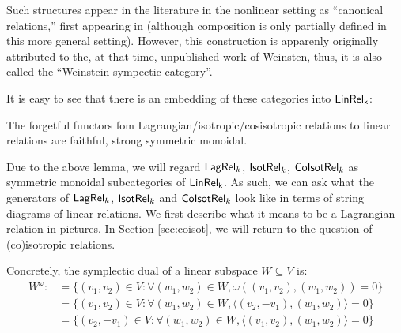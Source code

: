 Such structures appear in the literature in the nonlinear setting as ``canonical relations,'' first appearing in \cite{Guillemin} (although composition is only partially defined in this more general setting).  However, this construction is  apparenly originally attributed to the, at that time, unpublished work of Weinsten, thus, it is also called the ``Weinstein sympectic category''.




It is easy to see that there is an embedding of these categories into $\sf LinRel_k$:

\begin{lemma}
\label{lemma:strong}
The forgetful functors fom Lagrangian/isotropic/cosisotropic relations to linear relations  are faithful, strong symmetric monoidal.
\end{lemma}



Due to the above lemma, we will regard $\mathsf{Lag}\mathsf{Rel}_k$, ${\sf Isot}\mathsf{Rel}_k$, ${\sf Co}{\sf Isot}\mathsf{Rel}_k$ as symmetric monoidal subcategories of $\sf LinRel_k$.
As such, we can ask what the generators of $\mathsf{Lag}\mathsf{Rel}_k$, ${\sf Isot}\mathsf{Rel}_k$ and ${\sf Co}{\sf Isot}\mathsf{Rel}_k$ look like in terms of string diagrams of linear relations. We first describe what it means to be a Lagrangian relation in pictures.  In Section \ref{sec:coisot}, we will return to the question of (co)isotropic relations.

Concretely, the symplectic dual of a linear subspace $W \subseteq V$ is:
\begin{align*}
W^\omega :&= \{(v_1,v_2) \in V : \forall (w_1,w_2) \in W, \omega((v_1,v_2),(w_1,w_2))=0 \}\\
                    &= \{(v_1,v_2) \in V : \forall (w_1,w_2) \in W,  \langle (v_2,-v_1) ,(w_1,w_2)\rangle =0 \}\\
                    &= \{(v_2,-v_1) \in V : \forall (w_1,w_2) \in W,  \langle (v_1,v_2) ,(w_1,w_2)\rangle =0 \}
\end{align*}

